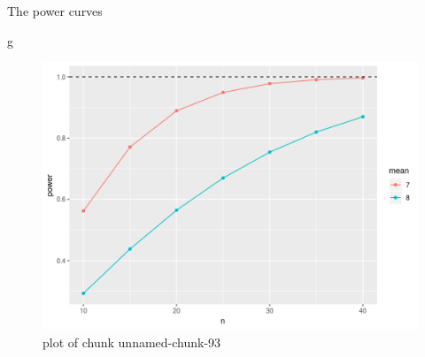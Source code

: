 \documentclass[ignorenonframetext,]{beamer}
\newenvironment{Shaded}{\begin{snugshade}}{\end{snugshade}}
\newcommand{\NormalTok}[1]{#1}
\begin{document}
\begin{frame}[fragile]{The power curves}
\protect\hypertarget{the-power-curves-1}{}

\begin{Shaded}
\begin{Highlighting}[]
\NormalTok{g}
\end{Highlighting}
\end{Shaded}

\begin{figure}
\centering
\includegraphics{figure/unnamed-chunk-93-1.png}
\caption{plot of chunk unnamed-chunk-93}
\end{figure}

\end{frame}
\end{document}
